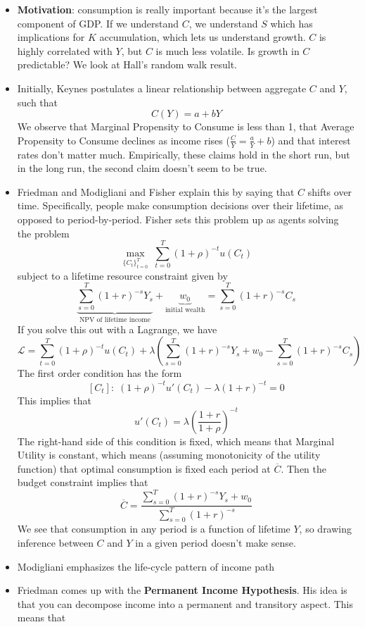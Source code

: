 \documentclass[12pt]{article}
\begin{document}
\begin{itemize}
    \item \textbf{Motivation}: consumption is really important because it's the largest component of GDP. If we understand $C$, we understand $S$ which has implications for $K$ accumulation, which lets us understand growth. $C$ is highly correlated with $Y$, but $C$ is much less volatile. Is growth in $C$ predictable? We look at Hall's random walk result. 
    \item Initially, Keynes postulates a linear relationship between aggregate $C$ and $Y$, such that
    \[C(Y) = a + bY\]
    We observe that Marginal Propensity to Consume is less than 1, that Average Propensity to Consume declines as income rises ($\frac{C}{Y} = \frac{a}{Y} + b$) and that interest rates don't matter much. Empirically, these claims hold in the short run, but in the long run, the second claim doesn't seem to be true. 
    \item Friedman and Modigliani and Fisher explain this by saying that $C$ shifts over time. Specifically, people make consumption decisions over their lifetime, as opposed to period-by-period. Fisher sets this problem up as agents solving the problem
    \[\max_{\{C_t\}_{t=0}^T}\; \sum_{t=0}^T (1+\rho)^{-t}u(C_t)\]
    subject to a lifetime resource constraint given by
    \[\underbrace{\sum_{s=0}^T(1+r)^{-s}Y_s}_{\text{NPV of lifetime income}} + \underbrace{w_0}_{\text{initial wealth}} = \sum_{s=0}^T(1+r)^{-s}C_s\]
    If you solve this out with a Lagrange, we have
    \[\mathcal{L} = \sum_{t=0}^T (1+\rho)^{-t}u(C_t) + \lambda\left(\sum_{s=0}^T(1+r)^{-s}Y_s + w_0 - \sum_{s=0}^T(1+r)^{-s}C_s\right)\]
    The first order condition has the form
    \[[C_t]:\; (1+\rho)^{-t}u'(C_t) -\lambda (1+r)^{-t} = 0\]
    This implies that
    \[u'(C_t) = \lambda \left(\frac{1+r}{1+\rho}\right)^{-t}\]
    The right-hand side of this condition is fixed, which means that Marginal Utility is constant, which means (assuming monotonicity of the utility function) that optimal consumption is fixed each period at $\overline{C}$. Then the budget constraint implies that 
    \[\overline{C} = \frac{\sum_{s=0}^T(1+r)^{-s}Y_s + w_0}{\sum_{s=0}^T(1+r)^{-s}}\]
    We see that consumption in any period is a function of lifetime $Y$, so drawing inference between $C$ and $Y$ in a given period doesn't make sense. 
    \item Modigliani emphasizes the life-cycle pattern of income path
    \item Friedman comes up with the \textbf{Permanent Income Hypothesis}. His idea is that you can decompose income into a permanent and transitory aspect. This means that

\end{itemize}
\end{document}
